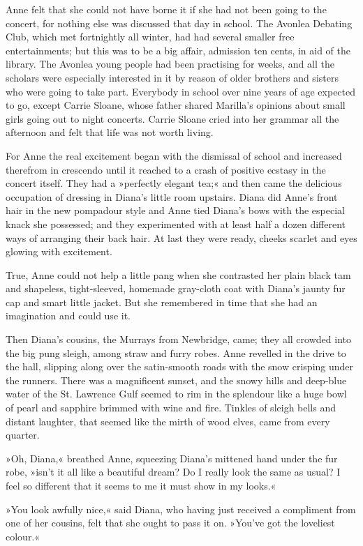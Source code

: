 Anne felt that she could not have borne it if she had not been going to the concert, for nothing else was discussed that day in school. The Avonlea Debating Club, which met fortnightly all winter, had had several smaller free entertainments; but this was to be a big affair, admission ten cents, in aid of the library. The Avonlea young people had been practising for weeks, and all the scholars were especially interested in it by reason of older brothers and sisters who were going to take part. Everybody in school over nine years of age expected to go, except Carrie Sloane, whose father shared Marilla’s opinions about small girls going out to night concerts. Carrie Sloane cried into her grammar all the afternoon and felt that life was not worth living.

For Anne the real excitement began with the dismissal of school and increased therefrom in crescendo until it reached to a crash of positive ecstasy in the concert itself. They had a »perfectly elegant tea;« and then came the delicious occupation of dressing in Diana’s little room upstairs. Diana did Anne’s front hair in the new pompadour style and Anne tied Diana’s bows with the especial knack she possessed; and they experimented with at least half a dozen different ways of arranging their back hair. At last they were ready, cheeks scarlet and eyes glowing with excitement.

True, Anne could not help a little pang when she contrasted her plain black tam and shapeless, tight-sleeved, homemade gray-cloth coat with Diana’s jaunty fur cap and smart little jacket. But she remembered in time that she had an imagination and could use it.

Then Diana’s cousins, the Murrays from Newbridge, came; they all crowded into the big pung sleigh, among straw and furry robes. Anne revelled in the drive to the hall, slipping along over the satin-smooth roads with the snow crisping under the runners. There was a magnificent sunset, and the snowy hills and deep-blue water of the St. Lawrence Gulf seemed to rim in the splendour like a huge bowl of pearl and sapphire brimmed with wine and fire. Tinkles of sleigh bells and distant laughter, that seemed like the mirth of wood elves, came from every quarter.

»Oh, Diana,« breathed Anne, squeezing Diana’s mittened hand under the fur robe, »isn’t it all like a beautiful dream? Do I really look the same as usual? I feel so different that it seems to me it must show in my looks.«

»You look awfully nice,« said Diana, who having just received a compliment from one of her cousins, felt that she ought to pass it on. »You’ve got the loveliest colour.«

